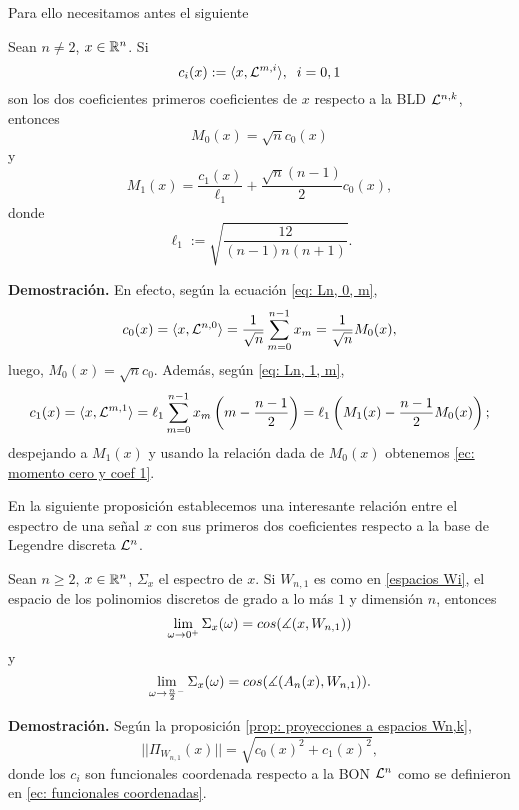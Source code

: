 Para ello necesitamos antes el siguiente
\begin{lema}
Sean $n \neq 2$, $x \in \mathbb{R}^{n}$.
Si
\begin{equation}
\label{ec: funcionales coordenadas}
c_{i}(x) := \langle x, \mathcal{L}^{m,i} \rangle,
\hspace{0.2cm} i = 0,1
\end{equation}
son los dos coeficientes primeros coeficientes
de $x$ respecto a la BLD $\mathcal{L}^{n,k}$,
entonces 
\begin{equation}
\label{ec: momento cero y coef 0}
M_{0}(x) = \sqrt{n} c_{0}(x)
\end{equation}
y
 \begin{equation}
\label{ec: momento cero y coef 1}
M_{1}(x) = \frac{c_{1}(x)}{\ell_{1}} + 
\frac{\sqrt{n}(n-1)}{2}c_{0}(x),
\end{equation}
donde
\begin{equation}
\label{ec: l1}
\ell_{1}:= \sqrt{\frac{
12
}{(n-1)n(n+1)}}.
\end{equation}
\end{lema}
\noindent
\textbf{Demostración.}
En efecto, según la ecuación
\eqref{eq: Ln, 0, m}, 
\[
c_{0}(x)= 
\langle x, \mathcal{L}^{n,0} \rangle
= \frac{1}{\sqrt{n}} \sum\limits_{m=0}^{n-1}x_{m}
= \frac{1}{\sqrt{n}} M_{0}(x),
\]
luego, 
$M_{0}(x) = \sqrt{n} c_{0}$.
Además, según \eqref{eq: Ln, 1, m},
\[
c_{1}(x)= 
\langle x, \mathcal{L}^{m,1} \rangle
= \ell_{1} \sum\limits_{m=0}^{n-1}x_{m} \left(
m-  \frac{n-1}{2}
\right)
= \ell_{1} \left(
M_{1}(x)-\frac{n-1}{2}M_{0}(x)
\right);
\]
despejando a $M_{1}(x)$ y usando la relación dada
de $M_{0}(x)$ obtenemos 
\eqref{ec: momento cero y coef 1}.
\QEDB
\vspace{0.2cm}

En la siguiente proposición establecemos
una interesante relación entre el espectro de una señal $x$
con sus primeros dos coeficientes respecto a la base
de Legendre discreta $\mathcal{L}^{n}$.
\begin{prop}
\label{prop: relacion limite cero con legendre}
Sean $n \geq 2$, $x \in \mathbb{R}^{n}$,
$\Sigma_{x}$ el espectro de $x$.
Si $W_{n,1}$ es como en 
\eqref{espacios Wi}, el espacio
de los polinomios discretos de grado 
a lo más $1$ y dimensión $n$, entonces
\begin{equation}
\label{eq: limite por cero como angulo}
\lim\limits_{\omega \rightarrow 0^{+}}{
\Sigma_{x}(\omega)} = cos(\measuredangle(x, W_{n,1}))
\end{equation}
y
\begin{equation}
\label{eq: limite por cero como angulo}
\lim\limits_{\omega \rightarrow \frac{n}{2}^{-}}{
\Sigma_{x}(\omega)} = cos(\measuredangle(A_{n}(x), W_{n,1})).
\end{equation}
\end{prop}
\noindent
\textbf{Demostración.}
Según la proposición 
\ref{prop: proyecciones a espacios Wn,k}, 
\begin{equation}
\label{eq0: 25May23} 
||\Pi_{W_{n,1}}(x)|| = \sqrt{c_{0}(x)^{2} + c_{1}(x)^{2}},
\end{equation}
donde los $c_{i}$ son funcionales coordenada respecto
a la BON $\mathcal{L}^{n}$ como se definieron en 
\ref{ec: funcionales coordenadas}.

